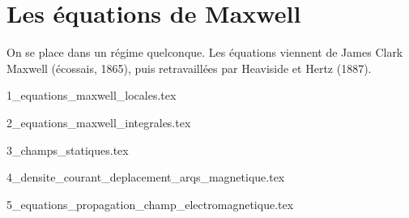 \chapter{Les équations de Maxwell}

On se place dans un régime quelconque. Les équations viennent de James Clark Maxwell (écossais, 1865), puis retravaillées par Heaviside et Hertz (1887).

\minitoc

{1_equations_maxwell_locales.tex}

{2_equations_maxwell_integrales.tex}

{3_champs_statiques.tex}

{4_densite_courant_deplacement_arqs_magnetique.tex}

{5_equations_propagation_champ_electromagnetique.tex}
